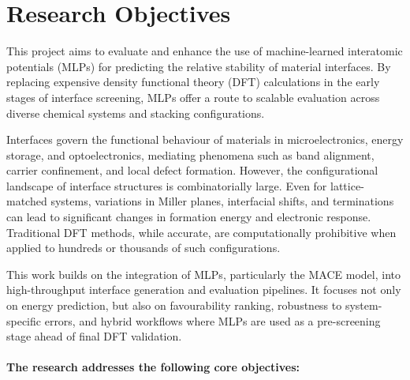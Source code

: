 \section{Research Objectives} \label{section:research_objectives}

This project aims to evaluate and enhance the use of machine-learned interatomic potentials (MLPs) for predicting the relative stability of material interfaces. By replacing expensive density functional theory (DFT) calculations in the early stages of interface screening, MLPs offer a route to scalable evaluation across diverse chemical systems and stacking configurations.

Interfaces govern the functional behaviour of materials in microelectronics, energy storage, and optoelectronics, mediating phenomena such as band alignment, carrier confinement, and local defect formation. However, the configurational landscape of interface structures is combinatorially large. Even for lattice-matched systems, variations in Miller planes, interfacial shifts, and terminations can lead to significant changes in formation energy and electronic response. Traditional DFT methods, while accurate, are computationally prohibitive when applied to hundreds or thousands of such configurations.

This work builds on the integration of MLPs, particularly the MACE model, into high-throughput interface generation and evaluation pipelines. It focuses not only on energy prediction, but also on favourability ranking, robustness to system-specific errors, and hybrid workflows where MLPs are used as a pre-screening stage ahead of final DFT validation.

\paragraph{The research addresses the following core objectives:}

